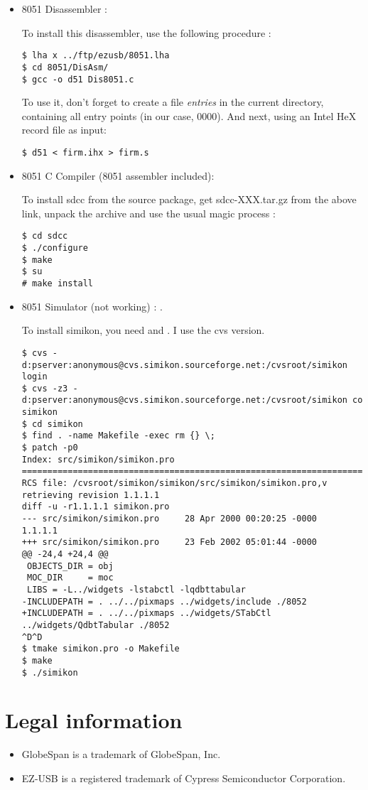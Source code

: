 \documentclass[a4paper,12pt]{article}
\begin{document}
\begin{itemize}
\item 8051 Disassembler :

To install this disassembler, use the following procedure :
\begin{verbatim}
$ lha x ../ftp/ezusb/8051.lha
$ cd 8051/DisAsm/
$ gcc -o d51 Dis8051.c
\end{verbatim}

To use it, don't forget to create a file \textit{entries} in the
current directory, containing all entry points (in our case,
0000). And next, using an Intel HeX record file as input:
\begin{verbatim}
$ d51 < firm.ihx > firm.s
\end{verbatim}

\item 8051 C Compiler (8051 assembler included):

To install sdcc from the source package, get sdcc-XXX.tar.gz from the
above link, unpack the archive and use the usual magic process :
\begin{verbatim}
$ cd sdcc
$ ./configure
$ make
$ su
# make install
\end{verbatim}

\item 8051 Simulator (not working) :
.
  
To install simikon, you need
 and
. I use the cvs version.

\begin{verbatim}
$ cvs -d:pserver:anonymous@cvs.simikon.sourceforge.net:/cvsroot/simikon login
$ cvs -z3 -d:pserver:anonymous@cvs.simikon.sourceforge.net:/cvsroot/simikon co simikon
$ cd simikon
$ find . -name Makefile -exec rm {} \;
$ patch -p0
Index: src/simikon/simikon.pro
===================================================================
RCS file: /cvsroot/simikon/simikon/src/simikon/simikon.pro,v
retrieving revision 1.1.1.1
diff -u -r1.1.1.1 simikon.pro
--- src/simikon/simikon.pro     28 Apr 2000 00:20:25 -0000      1.1.1.1
+++ src/simikon/simikon.pro     23 Feb 2002 05:01:44 -0000
@@ -24,4 +24,4 @@
 OBJECTS_DIR = obj
 MOC_DIR     = moc
 LIBS = -L../widgets -lstabctl -lqdbttabular
-INCLUDEPATH = . ../../pixmaps ../widgets/include ./8052
+INCLUDEPATH = . ../../pixmaps ../widgets/STabCtl ../widgets/QdbtTabular ./8052
^D^D
$ tmake simikon.pro -o Makefile
$ make
$ ./simikon
\end{verbatim}

\end{itemize}

\section{Legal information}

\begin{itemize}
\item GlobeSpan is a trademark of GlobeSpan, Inc.
\item EZ-USB is a registered trademark of Cypress Semiconductor Corporation.
\end{itemize}
\end{document}
